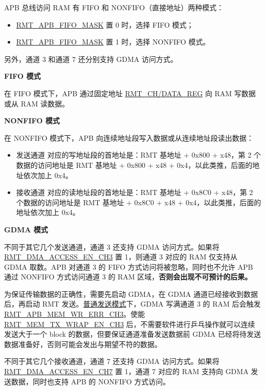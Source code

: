 \documentclass[main\_\_CN.tex]{subfiles}
\begin{document}
APB 总线访问 RAM 有 FIFO 和 NONFIFO（直接地址）两种模式：

\begin{itemize}
    \item \hyperref[fielddesc:RMTAPBFIFOMASK]{RMT\_APB\_FIFO\_MASK} 置 0 时，选择 FIFO 模式；
    \item \hyperref[fielddesc:RMTAPBFIFOMASK]{RMT\_APB\_FIFO\_MASK} 置 1 时，选择 NONFIFO 模式。
\end{itemize}

另外，通道 3 和通道 7 还分别支持 GDMA 访问方式。

\textbf{FIFO 模式}

在 FIFO 模式下，APB 通过固定地址 \hyperref[regdesc:RMTCHNDATAREG]{RMT\_CH/DATA\_REG} 向 RAM 写数据或从 RAM 读数据。

\textbf{NONFIFO 模式}

在 NONFIFO 模式下，APB 向连续地址段写入数据或从连续地址段读出数据：
\begin{itemize}
    \item 发送通道  对应的写地址段的首地址是：RMT 基地址 + 0x800 + x48，第 2 个数据的访问地址是 RMT 基地址 + 0x800 + x48 + 0x4，以此类推，后面的地址依次加上 0x4。
    \item 接收通道  对应的读地址段的首地址是：RMT 基地址 + 0x8C0 + x48，第 2 个数据的访问地址是 RMT 基地址 + 0x8C0 + x48 + 0x4，以此类推，后面的地址依次加上 0x4。
\end{itemize}

\textbf{GDMA 模式}

不同于其它几个发送通道，通道 3 还支持 GDMA 访问方式。如果将 \hyperref[fielddesc:RMTDMAACCESSENCH3]{RMT\_DMA\_ACCESS\_EN\_CH3} 置 1，则通道 3 对应的 RAM 仅支持从 GDMA 取数。APB 对通道 3 的 FIFO 方式访问将被忽略，同时也不允许 APB 通过 NONFIFO 方式访问通道 3 的 RAM 区域，\textbf{否则会出现不可预计的后果。}

为保证传输数据的正确性，需要先启动 GDMA，在 GDMA 通道已经接收到数据后，再启动 RMT 发送。\hyperref[sec:normal-tx-mode]{普通发送模式}下，GDMA 写满通道 3 的 RAM 后会触发 \hyperref[fielddesc:RMTAPBMEMWRERRCHN]{RMT\_APB\_MEM\_WR\_ERR\_CH3}。使能 \hyperref[fielddesc:RMTMEMTXWRAPENCHN]{RMT\_MEM\_TX\_WRAP\_EN\_CH3} 后，不需要软件进行乒乓操作就可以连续发送大于一个 block 的数据，但要保证通道准备发送数据前 GDMA 已经将待发送数据准备好，否则可能会发出与期望不符的数据。

不同于其它几个接收通道，通道 7 还支持 GDMA 访问方式。如果将 \hyperref[fielddesc:RMTDMAACCESSENCH7]{RMT\_DMA\_ACCESS\_EN\_CH7} 置 1，通道 7 对应的 RAM 支持向 GDMA 发送数据，同时也支持 APB 的 NONFIFO 方式访问。
\end{document}
